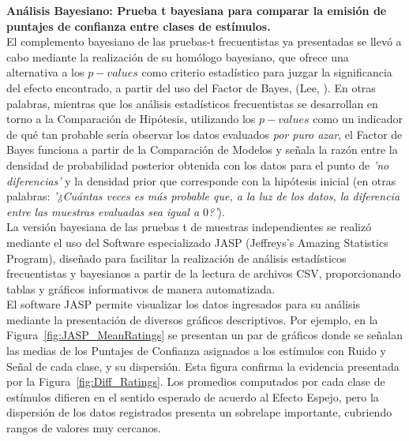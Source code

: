 \textbf{Análisis Bayesiano: Prueba t bayesiana para comparar la emisión de puntajes de confianza entre clases de estímulos.}\\

El complemento bayesiano de las pruebas-t frecuentistas ya presentadas se llevó a cabo mediante la realización de su homólogo bayesiano, que ofrece una alternativa a los $p-values$ como criterio estadístico para juzgar la significancia del efecto encontrado, a partir del uso del Factor de Bayes, (Lee, \citeyear{Lee2016}). En otras palabras, mientras que los análisis estadísticos frecuentistas se desarrollan en torno a la Comparación de Hipótesis, utilizando los $p-values$ como un indicador de qué tan probable sería observar los datos evaluados \textit{por puro azar}, el Factor de Bayes funciona a partir de la Comparación de Modelos y señala la razón entre la densidad de probabilidad posterior obtenida con los datos para el punto de \textit{'no diferencias'} y la densidad prior que corresponde con la hipótesis inicial (en otras palabras: \textit{'¿Cuántas veces es más probable que, a la luz de los datos, la diferencia entre las muestras evaluadas sea igual a $0$?'}).\\

La versión bayesiana de las pruebas t de muestras independientes se realizó mediante el uso del Software especializado JASP (Jeffreys's Amazing Statistics Program), diseñado para facilitar la realización de análisis estadísticos frecuentistas y bayesianos a partir de la lectura de archivos CSV, proporcionando tablas y gráficos informativos de manera automatizada.\\

El software JASP permite visualizar los datos ingresados para su análisis mediante la presentación de diversos gráficos descriptivos. Por ejemplo, en la Figura~\ref{fig:JASP_MeanRatings} se presentan un par de gráficos donde se señalan las medias de los Puntajes de Confianza asignados a los estímulos con Ruido y Señal de cada clase, y su dispersión. Esta figura confirma la evidencia presentada por la Figura~\ref{fig:Diff_Ratings}. Los promedios computados por cada clase de estímulos difieren en el sentido esperado de acuerdo al Efecto Espejo, pero la dispersión de los datos registrados presenta un sobrelape importante, cubriendo rangos de valores muy cercanos.\\

